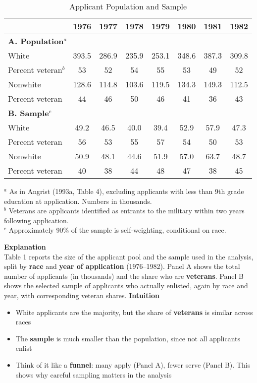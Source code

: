 \documentclass[12pt]{article}
\begin{document}
\begin{table}[H]
\centering
\caption{Applicant Population and Sample}
\begin{tabular}{lccccccc}
\hline
 & 1976 & 1977 & 1978 & 1979 & 1980 & 1981 & 1982 \\
\hline
\multicolumn{8}{l}{\textbf{A. Population$^a$}} \\
White & 393.5 & 286.9 & 235.9 & 253.1 & 348.6 & 387.3 & 309.8 \\
Percent veteran$^b$ & 53 & 52 & 54 & 55 & 53 & 49 & 52 \\
Nonwhite & 128.6 & 114.8 & 103.6 & 119.5 & 134.3 & 149.3 & 112.5 \\
Percent veteran & 44 & 46 & 50 & 46 & 41 & 36 & 43 \\
\hline
\multicolumn{8}{l}{\textbf{B. Sample$^c$}} \\
White & 49.2 & 46.5 & 40.0 & 39.4 & 52.9 & 57.9 & 47.3 \\
Percent veteran & 56 & 53 & 55 & 57 & 54 & 50 & 53 \\
Nonwhite & 50.9 & 48.1 & 44.6 & 51.9 & 57.0 & 63.7 & 48.7 \\
Percent veteran & 40 & 38 & 44 & 48 & 47 & 38 & 45 \\
\hline
\end{tabular}

\begin{flushleft}
\footnotesize 
$^a$ As in Angrist (1993a, Table 4), excluding applicants with less than 9th grade education at application. Numbers in thousands. \\
$^b$ Veterans are applicants identified as entrants to the military within two years following application. \\
$^c$ Approximately 90\% of the sample is self-weighting, conditional on race. \\
\end{flushleft}
\end{table}

\doublespacing
\textbf{Explanation} \\
Table 1 reports the size of the applicant pool and the sample used in the analysis, 
split by \textbf{race} and \textbf{year of application} (1976--1982). 
Panel A shows the total number of applicants (in thousands) and the share who are 
\textbf{veterans}. Panel B shows the selected sample of applicants who actually 
enlisted, again by race and year, with corresponding veteran shares. 
\singlespacing
\textbf{Intuition}
\begin{itemize}
    \item White applicants are the majority, but the share of \textbf{veterans} is similar across races
    \item The \textbf{sample} is much smaller than the population, since not all applicants enlist
    \item Think of it like a \textbf{funnel}: many apply (Panel A), fewer serve (Panel B). 
    This shows why careful sampling matters in the analysis
\end{itemize}
\end{document}
